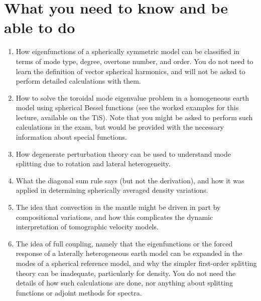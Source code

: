 \section*{What you need to know and be able to do}
\begin{enumerate}
    \item[(i)] How eigenfunctions of a spherically symmetric model can be classified in terms of mode type, degree, overtone number, and order. 
    You do not need to learn the definition of vector spherical harmonics, and will not be asked to perform detailed calculations with them.
    \item[(ii)] How to solve the toroidal mode eigenvalue problem in a homogeneous earth model using spherical Bessel functions (see the 
    worked examples for this lecture, available on the TiS). Note that you might be asked to perform such calculations in the exam, but would be provided with the necessary 
    information about special functions.
    \item[(iii)] How degenerate perturbation theory can be used to understand mode splitting due to rotation and lateral heterogeneity.     
    \item[(iv)] What the diagonal sum rule says (but not the derivation), and how it was applied in determining spherically averaged 
    density variations.
    \item[(v)] The idea that convection in the mantle might be driven in part by compositional variations, and how this complicates 
    the dynamic interpretation of tomographic velocity models.
    \item[(vi)] The idea of full coupling, namely that the eigenfunctions or the forced response of a laterally heterogeneous earth 
    model can be expanded in the modes of a spherical reference model, and why the simpler first-order splitting theory can be inadequate, 
    particularly for density. You do not need the details of how such calculations are done, nor anything about splitting 
    functions or adjoint methods for spectra.
\end{enumerate}
